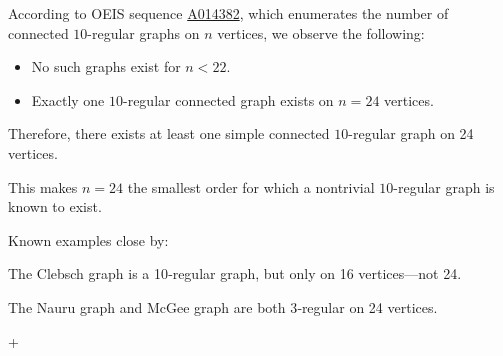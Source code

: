 \documentclass[runningheads]{llncs}
\begin{document}
According to OEIS sequence \href{https://oeis.org/A014382}{A014382}, which enumerates the number of connected $10$-regular graphs on $n$ vertices, we observe the following:

\begin{itemize}
  \item No such graphs exist for $n < 22$.
  \item Exactly one $10$-regular connected graph exists on $n = 24$ vertices.
\end{itemize}

Therefore, there exists at least one simple connected $10$-regular graph on 24 vertices.

\medskip

This makes $n = 24$ the smallest order for which a nontrivial $10$-regular graph is known to exist.

Known examples close by:

    The Clebsch graph is a 10‑regular graph, but only on 16 vertices—not 24.
 
    The Nauru graph and McGee graph are both 3‑regular on 24 vertices.



+







\end{document}
